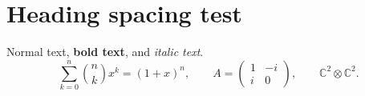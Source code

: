 \documentclass{article}
\begin{document}
\section{\sffamily Heading spacing test}
Normal text, \textbf{bold text}, and \textit{italic text}.
\[
  \sum_{k=0}^{n}\binom{n}{k}x^k=(1+x)^n,
  \qquad
  A=\begin{pmatrix}1&-i\\i&0\end{pmatrix},
  \qquad
  \mathbb{C}^{2}\otimes\mathbb{C}^{2}.
\]
\end{document}
